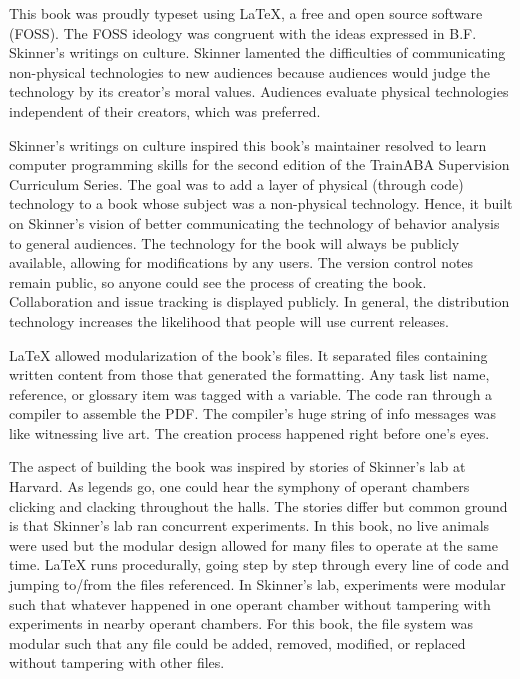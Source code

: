 This book was proudly typeset using \LaTeX{}, a free and open source software (FOSS). The FOSS ideology was congruent with the ideas expressed in B.F. Skinner's writings on culture. Skinner lamented the difficulties of communicating non-physical technologies to new audiences because audiences would judge the technology by its creator's moral values. Audiences evaluate physical technologies independent of their creators, which was preferred. 

Skinner's writings on culture inspired this book's maintainer resolved to learn computer programming skills for the second edition of the TrainABA Supervision Curriculum Series. The goal was to add a layer of physical (through code) technology to a book whose subject was a non-physical technology. Hence, it built on Skinner's vision of better communicating the technology of behavior analysis to general audiences. The technology for the book will always be publicly available, allowing for modifications by any users. The version control notes remain public, so anyone could see the process of creating the book. Collaboration and issue tracking is displayed publicly. In general, the distribution technology increases the likelihood that people will use current releases.

\LaTeX{} allowed modularization of the book's files. It separated files containing written content from those that generated the formatting. Any task list name, reference, or glossary item was tagged with a variable. The code ran through a compiler to assemble the PDF. The compiler's huge string of info messages was like witnessing live art. The creation process happened right before one's eyes. 

The aspect of building the book was inspired by stories of Skinner's lab at Harvard. As legends go, one could hear the symphony of operant chambers clicking and clacking throughout the halls. The stories differ but common ground is that Skinner's lab ran concurrent experiments. In this book, no live animals were used but the modular design allowed for many files to operate at the same time. \LaTeX{} runs procedurally, going step by step through every line of code and jumping to/from the files referenced. In Skinner's lab, experiments were modular such that whatever happened in one operant chamber without tampering with experiments in nearby operant chambers. For this book, the file system was modular such that any file could be added, removed, modified, or replaced without tampering with other files.
    
